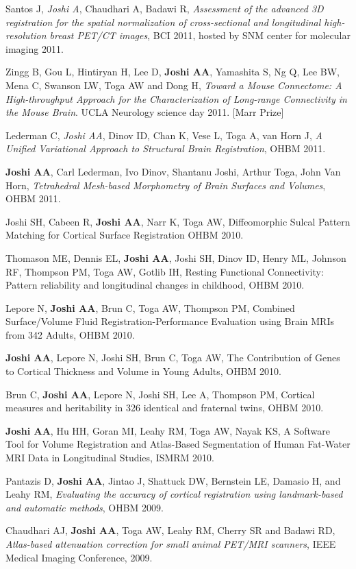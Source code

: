 \documentclass[overlapped,line,letterpaper]{res}
\begin{document}
\begin{resume}
Santos J, \textit{Joshi A}, Chaudhari A, Badawi R, \textit{Assessment of the advanced 3D registration for the spatial normalization of cross-sectional and longitudinal high-resolution breast PET/CT images}, BCI 2011, hosted by SNM center for molecular imaging  2011.

Zingg B, Gou L, Hintiryan H, Lee D, \textbf{Joshi AA}, Yamashita S, Ng Q, Lee BW, Mena C, Swanson LW, Toga AW and Dong H, \textit{Toward a Mouse Connectome: A High-throughput Approach for the Characterization of Long-range Connectivity in the Mouse Brain}. UCLA Neurology science day 2011. [Marr Prize]

Lederman C, \textit{Joshi AA}, Dinov ID, Chan K, Vese L, Toga A, van Horn J, \textit{A Unified Variational Approach to Structural Brain Registration}, OHBM 2011.

\textbf{Joshi AA}, Carl Lederman, Ivo Dinov, Shantanu Joshi, Arthur Toga, John Van Horn, \textit{Tetrahedral Mesh-based Morphometry of Brain Surfaces and Volumes}, OHBM 2011.


Joshi SH, Cabeen R, \textbf{Joshi AA}, Narr K, Toga AW, Diffeomorphic Sulcal Pattern Matching for Cortical Surface Registration OHBM 2010.

Thomason ME, Dennis EL, \textbf{Joshi AA}, Joshi SH, Dinov ID, Henry ML, Johnson RF, Thompson PM, Toga AW, Gotlib IH, Resting Functional Connectivity: Pattern reliability and longitudinal changes in childhood, OHBM 2010.

Lepore N, \textbf{Joshi AA}, Brun C, Toga AW, Thompson PM, Combined Surface/Volume Fluid Registration-Performance Evaluation using Brain MRIs from 342 Adults, OHBM 2010.

\textbf{Joshi AA}, Lepore N, Joshi SH, Brun C, Toga AW, The Contribution of Genes to  Cortical Thickness and Volume in Young Adults, OHBM 2010.

Brun C, \textbf{Joshi AA}, Lepore N, Joshi SH, Lee A, Thompson PM, Cortical measures and heritability in 326 identical and fraternal twins, OHBM 2010.

\textbf{Joshi AA}, Hu HH, Goran MI, Leahy RM, Toga AW, Nayak KS, A Software Tool for Volume Registration and Atlas-Based Segmentation of Human Fat-Water MRI Data in Longitudinal Studies, ISMRM 2010.

Pantazis D, \textbf{Joshi AA}, Jintao J, Shattuck DW, Bernstein LE, Damasio H, and Leahy RM, \textit{Evaluating the accuracy of cortical registration using landmark-based and automatic methods}, OHBM 2009.

Chaudhari AJ, \textbf{Joshi AA}, Toga AW, Leahy RM, Cherry SR and Badawi RD, \textit{Atlas-based attenuation correction for small animal PET/MRI scanners}, IEEE Medical Imaging Conference, 2009.


\end{resume}
\end{document}
